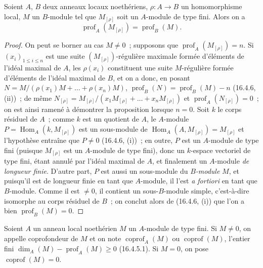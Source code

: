 \begin{proposition}[16.4.8]
\label{0.16.4.8-fr}
Soient $A$, $B$ deux anneaux locaux noethériens,
$\rho:A\to B$ un homomorphisme local, $M$ un $B$-module tel que
$M_{[\rho]}$ soit un $A$-module de type fini. Alors on a
\begin{equation}
\label{0.16.4.8.1-fr}
\tag{16.4.8.1}
  \operatorname{prof}_A(M_{[\rho]})=\operatorname{prof}_B(M).
\end{equation}
\end{proposition}

\begin{proof}
On peut se borner au cas $M\neq0$~; supposons que
$\operatorname{prof}_A(M_{[\rho]})=n$. Si $(x_i)_{1\leq i\leq n}$ est une
suite $(M_{[\rho]})$-régulière maximale formée d'éléments de l'idéal maximal
de $A$, les $\rho(x_i)$ constituent une suite $M$-régulière formée d'éléments
de l'idéal maximal de $B$, et on a donc, en posant
$N=M/(\rho(x_1)M+\ldots+\rho(x_n)M)$,
$\operatorname{prof}_B(N)=\operatorname{prof}_B(M)-n$ (16.4.6, (ii))~; de
même
$N_{[\rho]}=M_{[\rho]}/(x_1M_{[\rho]}+\ldots+x_nM_{[\rho]})$ et
$\operatorname{prof}_A(N_{[\rho]})=0$~; on est ainsi ramené à démontrer la
proposition lorsque $n=0$. Soit $k$ le corps résiduel de $A$~; comme $k$ est
un quotient de $A$, le $A$-module
$P=\operatorname{Hom}_A(k,M_{[\rho]})$ est un sous-module de
$\operatorname{Hom}_A(A,M_{[\rho]})=M_{[\rho]}$ et l'hypothèse entraîne que
$P\neq0$ (16.4.6, (i))~; en outre, $P$ est un $A$-module de type fini
(puisque $M_{[\rho]}$ est un $A$-module de type fini), donc un $k$-espace
vectoriel de type fini, étant annulé par l'idéal maximal de $A$, et finalement
un $A$-module \emph{de longueur finie}. D'autre part, $P$ est aussi un sous-module du
\emph{$B$-module} $M$, et puisqu'il est de longueur finie en tant que $A$-module, il
l'est \emph{a fortiori} en tant que $B$-module. Comme il est $\neq0$, il
contient un sous-$B$-module simple, c'est-à-dire isomorphe au corps résiduel de
$B$~; on conclut alors de (16.4.6, (i)) que l'on a bien
$\operatorname{prof}_B(M)=0$.
\end{proof}

\begin{definition}[16.4.9]
\label{0.16.4.9-fr}
Soient $A$ un anneau local noethérien $M$ un $A$-module de type fini. Si
$M\neq0$, on appelle coprofondeur de $M$ et on note
$\operatorname{coprof}_A(M)$ ou $\operatorname{coprof}(M)$, l'entier fini
$\dim_A(M)-\operatorname{prof}_A(M)\geq0$ (16.4.5.1). Si $M=0$, on pose
$\operatorname{coprof}(M)=0$.
\end{definition}

